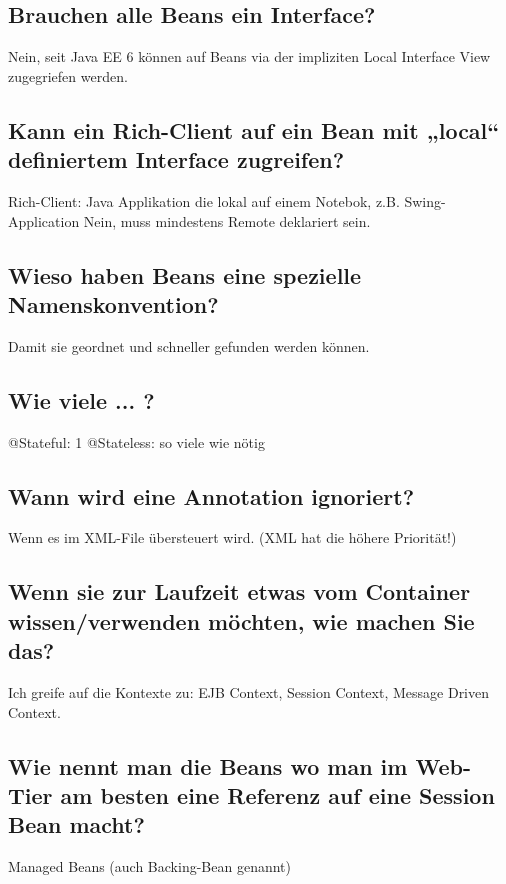 \subsection{Brauchen alle Beans ein Interface?}
Nein, seit Java EE 6 können auf Beans via der impliziten Local Interface View zugegriefen werden.

\subsection{Kann ein Rich-Client auf ein Bean mit „local“ definiertem Interface zugreifen?}
Rich-Client: Java Applikation die lokal auf einem Notebok, z.B. Swing-Application
Nein, muss mindestens Remote deklariert sein.

\subsection{Wieso haben Beans eine spezielle Namenskonvention?}
Damit sie geordnet und schneller gefunden werden können.

\subsection{Wie viele ... ?}
@Stateful: 1
@Stateless: so viele wie nötig

\subsection{Wann wird eine Annotation ignoriert?}
Wenn es im XML-File übersteuert wird. (XML hat die höhere Priorität!)

\subsection{Wenn sie zur Laufzeit etwas vom Container wissen/verwenden möchten, wie machen Sie das?}
Ich greife auf die Kontexte zu: EJB Context, Session Context, Message Driven Context.

\subsection{Wie nennt man die Beans wo man im Web-Tier am besten eine Referenz auf eine Session Bean macht?}
Managed Beans (auch Backing-Bean genannt)
